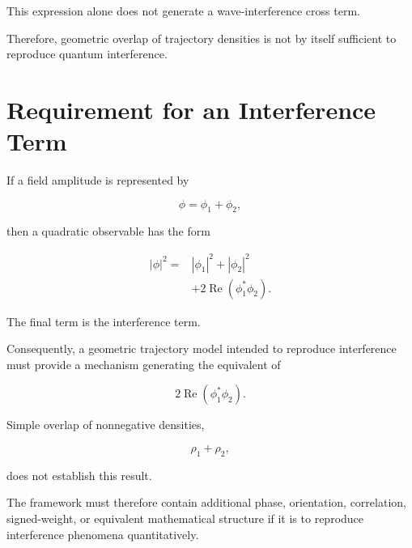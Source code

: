 \documentclass[12pt,oneside]{book}
\begin{document}
This expression alone does not generate a wave-interference
cross term.

Therefore, geometric overlap of trajectory densities is not by
itself sufficient to reproduce quantum interference.


\section{Requirement for an Interference Term}
\label{sec:interference-requirement}

If a field amplitude is represented by

\begin{equation}
    \phi
    =
    \phi_1
    +
    \phi_2,
\end{equation}

then a quadratic observable has the form

\begin{equation}
\begin{aligned}
    |\phi|^2
    ={}&
    |\phi_1|^2
    +
    |\phi_2|^2
    \\
    &+
    2\operatorname{Re}
    \left(
        \phi_1^\ast\phi_2
    \right).
\end{aligned}
\label{eq:interference-cross-term}
\end{equation}

The final term is the interference term.

Consequently, a geometric trajectory model intended to reproduce
interference must provide a mechanism generating the equivalent
of

\begin{equation}
    2\operatorname{Re}
    \left(
        \phi_1^\ast\phi_2
    \right).
\end{equation}

Simple overlap of nonnegative densities,

\begin{equation}
    \rho_1+\rho_2,
\end{equation}

does not establish this result.

The framework must therefore contain additional phase,
orientation, correlation, signed-weight, or equivalent
mathematical structure if it is to reproduce interference
phenomena quantitatively.
\end{document}
